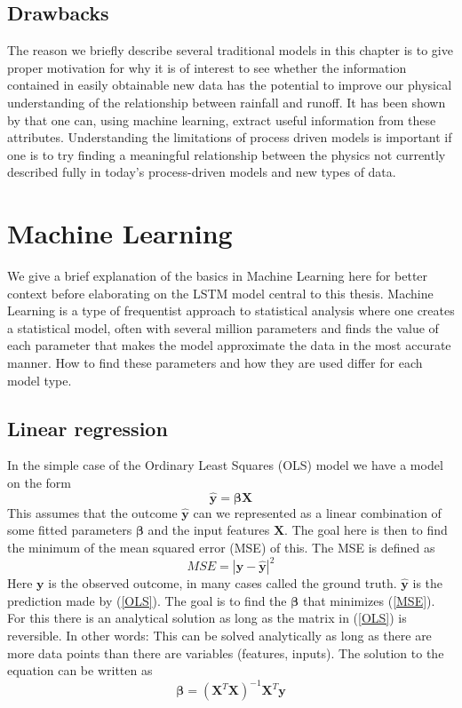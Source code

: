 \subsection{Drawbacks}
The reason we briefly describe several traditional models in this chapter is to 
give proper motivation for why it is of interest to see whether the information 
contained in easily obtainable new data has the potential to improve 
our physical understanding of the relationship between rainfall and runoff. It has 
been shown by \citet{lstm_third_paper} that one can, using machine learning, extract 
useful information from these attributes. Understanding the limitations of process 
driven models is important if one is to try finding a 
meaningful relationship between the physics not currently described fully in 
today's process-driven models and new types of data. 

\section{Machine Learning}
We give a brief explanation of the basics in Machine Learning here for better context 
before elaborating on the LSTM model central to this thesis.
Machine Learning is a type of frequentist approach to statistical analysis where 
one creates a statistical model, often with several million parameters and finds 
the value of each parameter that makes the model approximate the data in the most 
accurate manner. How to find these parameters and how they are used differ for each 
model type. 
\subsection{Linear regression}
In the simple case of the Ordinary Least Squares (OLS) model we have a model on the form 
\begin{equation}
\mathbf{\hat{y}} = \mathbf{\beta} \mathbf{X}
\label{OLS}
\end{equation}
This assumes that the outcome $\mathbf{\hat{y}}$ can we represented as a linear combination 
of some fitted parameters $\mathbf{\beta}$ and the input features $\mathbf{X}$.
The goal here is then to find the minimum of the mean squared error (MSE) of this.
The MSE is defined as 
\begin{equation}
MSE = |\mathbf{y} - \mathbf{\hat{y}}|^2
\label{MSE}
\end{equation}
Here $\mathbf{y}$ is the observed outcome, in many cases called the ground truth.
$\mathbf{\hat{y}}$ is the prediction made by (\ref{OLS}). The goal is to find the
$\mathbf{\beta}$ that minimizes (\ref{MSE}). For this there is an analytical solution 
as long as the matrix in (\ref{OLS}) is reversible. In other words: This can be solved
analytically as long as there are more data points than there are variables (features, inputs).
The solution to the equation can be written as 
\begin{equation}
\mathbf{\beta} = (\mathbf{X}^T\mathbf{X})^{-1}\mathbf{X}^{T}\mathbf{y}
\label{OLS solution}
\end{equation}
